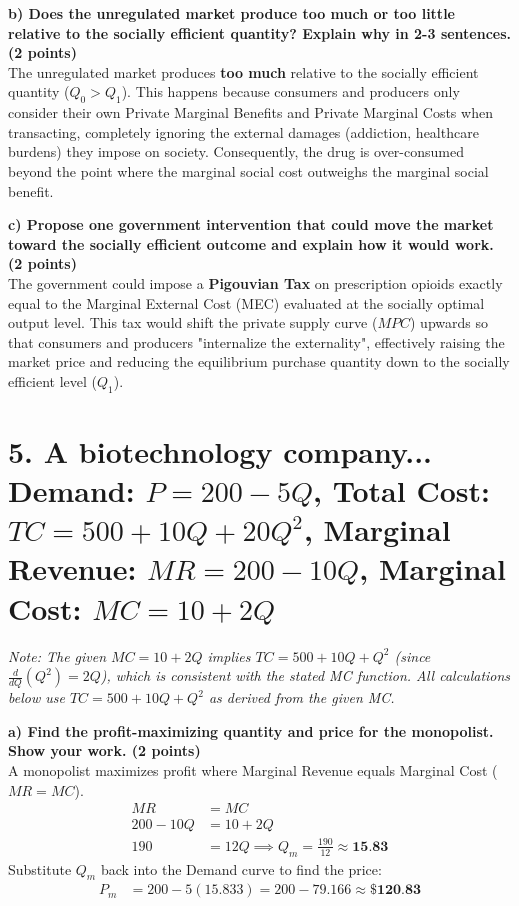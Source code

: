 \documentclass[11pt, letterpaper]{article}
\begin{document}
\textbf{b) Does the unregulated market produce too much or too little relative to the socially efficient quantity? Explain why in 2-3 sentences. (2 points)} \\
The unregulated market produces \textbf{too much} relative to the socially efficient quantity ($Q_0 > Q_1$). This happens because consumers and producers only consider their own Private Marginal Benefits and Private Marginal Costs when transacting, completely ignoring the external damages (addiction, healthcare burdens) they impose on society. Consequently, the drug is over-consumed beyond the point where the marginal social cost outweighs the marginal social benefit.

\textbf{c) Propose one government intervention that could move the market toward the socially efficient outcome and explain how it would work. (2 points)} \\
The government could impose a \textbf{Pigouvian Tax} on prescription opioids exactly equal to the Marginal External Cost (MEC) evaluated at the socially optimal output level. This tax would shift the private supply curve ($MPC$) upwards so that consumers and producers "internalize the externality", effectively raising the market price and reducing the equilibrium purchase quantity down to the socially efficient level ($Q_1$).

\section*{5. A biotechnology company... Demand: $P = 200 - 5Q$, Total Cost: $TC = 500 + 10Q + 20Q^2$, Marginal Revenue: $MR = 200 - 10Q$, Marginal Cost: $MC = 10 + 2Q$}

\textit{Note: The given $MC = 10 + 2Q$ implies $TC = 500 + 10Q + Q^2$ (since $\frac{d}{dQ}(Q^2) = 2Q$), which is consistent with the stated MC function. All calculations below use $TC = 500 + 10Q + Q^2$ as derived from the given MC.}

\textbf{a) Find the profit-maximizing quantity and price for the monopolist. Show your work. (2 points)} \\
A monopolist maximizes profit where Marginal Revenue equals Marginal Cost ($MR = MC$).
\begin{align*}
    MR &= MC \\
    200 - 10Q &= 10 + 2Q \\
    190 &= 12Q \implies Q_m = \frac{190}{12} \approx \textbf{15.83}
\end{align*}
Substitute $Q_m$ back into the Demand curve to find the price:
\begin{align*}
    P_m &= 200 - 5(15.833) = 200 - 79.166 \approx \textbf{\$120.83}
\end{align*}
\end{document}

